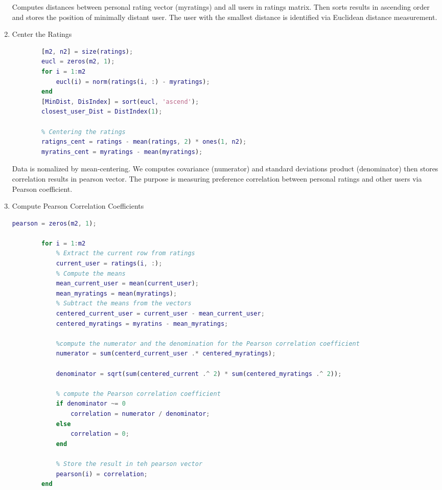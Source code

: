 \begin{enumerate}[label=\alph*.]
	Computes distances between personal rating vector (myratings) and all users in ratings matrix. Then sorts results in ascending order and stores the position of minimally distant user. The user with the smallest distance is identified via Euclidean distance measurement.
	
	\item Center the Ratings
	
	\begin{lstlisting}[style=StyleCode, language=MATLAB]
		% Find the Euclidean distance
		[m2, n2] = size(ratings);
		eucl = zeros(m2, 1);
		for i = 1:m2
			eucl(i) = norm(ratings(i, :) - myratings);
		end
		[MinDist, DisIndex] = sort(eucl, 'ascend');
		closest_user_Dist = DistIndex(1);
		
		% Centering the ratings
		ratigns_cent = ratings - mean(ratings, 2) * ones(1, n2);
		myratins_cent = myratings - mean(myratings);
	\end{lstlisting}
	
	Data is nomalized by mean-centering. We computes covariance (numerator) and standard deviations product (denominator) then stores correlation results in pearson vector. The purpose is measuring preference correlation between personal ratings and other users via Pearson coefficient.
	
	\item Compute Pearson Correlation Coefficients
	
	\begin{lstlisting}[style=StyleCode, language=MATLAB]
		pearson = zeros(m2, 1);
		
		for i = 1:m2
			% Extract the current row from ratings
			current_user = ratings(i, :);
			% Compute the means
			mean_current_user = mean(current_user);
			mean_myratings = mean(myratings);
			% Subtract the means from the vectors
			centered_current_user = current_user - mean_current_user;
			centered_myratings = myratins - mean_myratings;
			
			%compute the numerator and the denomination for the Pearson correlation coefficient
			numerator = sum(centerd_current_user .* centered_myratings);
			
			denominator = sqrt(sum(centered_current .^ 2) * sum(centered_myratings .^ 2));
			
			% compute the Pearson correlation coefficient
			if denominator ~= 0
				correlation = numerator / denominator;
			else 
				correlation = 0;
			end
			
			% Store the result in teh pearson vector
			pearson(i) = correlation;
		end
		

\end{lstlisting}
\end{enumerate}
